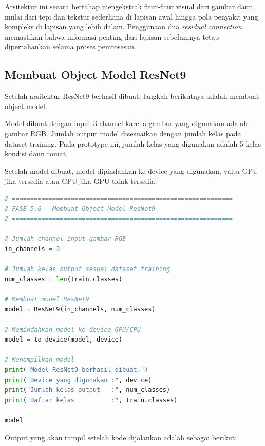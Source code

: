 Arsitektur ini secara bertahap mengekstrak fitur-fitur visual dari gambar daun, mulai dari tepi dan tekstur sederhana di lapisan awal hingga pola penyakit yang kompleks di lapisan yang lebih dalam. Penggunaan dua \textit{residual connection} memastikan bahwa informasi penting dari lapisan sebelumnya tetap dipertahankan selama proses pemrosesan.

\subsection{Membuat Object Model ResNet9}

Setelah arsitektur ResNet9 berhasil dibuat, langkah berikutnya adalah membuat object model.

Model dibuat dengan input 3 channel karena gambar yang digunakan adalah gambar RGB. Jumlah output model disesuaikan dengan jumlah kelas pada dataset training. Pada prototype ini, jumlah kelas yang digunakan adalah 5 kelas kondisi daun tomat.

Setelah model dibuat, model dipindahkan ke device yang digunakan, yaitu GPU jika tersedia atau CPU jika GPU tidak tersedia.

\begin{lstlisting}[language=Python, caption=Membuat object model ResNet9]
# ============================================================
# FASE 5.6 - Membuat Object Model ResNet9
# ============================================================

# Jumlah channel input gambar RGB
in_channels = 3

# Jumlah kelas output sesuai dataset training
num_classes = len(train.classes)

# Membuat model ResNet9
model = ResNet9(in_channels, num_classes)

# Memindahkan model ke device GPU/CPU
model = to_device(model, device)

# Menampilkan model
print("Model ResNet9 berhasil dibuat.")
print("Device yang digunakan :", device)
print("Jumlah kelas output   :", num_classes)
print("Daftar kelas          :", train.classes)

model
\end{lstlisting}

Output yang akan tampil setelah kode dijalankan adalah sebagai berikut:

